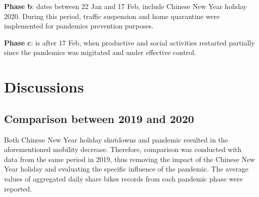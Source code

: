 \documentclass[preprints,ijgi,submit,moreauthors]{Definitions/mdpi}
\begin{document}
\textbf{Phase b}: dates between 22 Jan and 17 Feb, include Chinese New Year holiday 2020. During this period, traffic suspension and home quarantine were implemented for pandemics prevention purposes.

\textbf{Phase c}: is after 17 Feb, when productive and social activities restarted partially since the pandemics was migitated and under effective control.


\section{Discussions}
\subsection{Comparison between 2019 and 2020}%

Both Chinese New Year holiday shutdowns and pandemic resulted in the aforementioned mobility decrease.
Therefore, comparison was conducted with data from the same period in 2019, thus removing the impact of the Chinese New Year holiday and evaluating the specific influence of the pandemic.  
The average values of aggregated daily share bikes records from each pandemic phase were reported.
\end{document}
